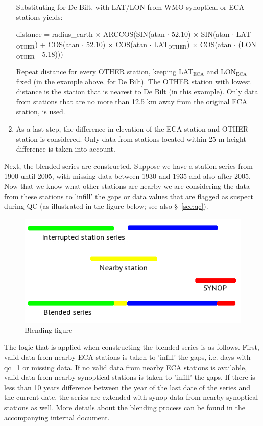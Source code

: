 \documentclass[a4paper,11pt]{article}
\begin{document}
\begin{enumerate}
Substituting for De Bilt, with LAT/LON from WMO synoptical or
ECA-stations yields:
\medskip

distance = radius\_earth $\times$
ARCCOS(SIN(atan $\cdot$ 52.10) $\times$
SIN(atan $\cdot$ LAT$_{\textrm{OTHER}}$) + COS(atan $\cdot$ 52.10) $\times$
COS(atan $\cdot$ LAT$_{\textrm{OTHER}}$) $\times$
COS(atan $\cdot$ (LON$_{\textrm{OTHER}}$ - 5.18)))
\medskip

Repeat distance for every OTHER station, keeping LAT$_{\textrm{ECA}}$
and LON$_{\textrm{ECA}}$ fixed (in the example above, for De
Bilt). The OTHER station with lowest distance is the station that is
nearest to De Bilt (in this example). Only data from stations that are
no more than 12.5 km away from the original ECA station, is used.

\item As a last step, the difference in elevation of the ECA station
  and OTHER station is considered. Only data from stations located
  within 25 m height difference is taken into account.
\end{enumerate}

Next, the blended series are constructed. Suppose we have a station
series from 1900 until 2005, with missing data between 1930 and 1935
and also after 2005. Now that we know what other stations are nearby
we are considering the data from these stations to 'infill' the gaps
or data values that are flagged as suspect during QC (as illustrated
in the figure below; see also \S~\ref{sec:qc}).

\begin{figure}[!ht]
\includegraphics[width=\textwidth]{blended_fig_new1.jpg}
\caption{Blending figure}
\label{fig:blend}
\end{figure}

The logic that is applied when constructing the blended series is as
follows. First, valid data from nearby ECA stations is taken to
'infill' the gaps, i.e. days with qc=1 or missing data. If no valid
data from nearby ECA stations is available, valid data from nearby
synoptical stations is taken to 'infill' the gaps. If there is less
than 10 years difference between the year of the last date of the
series and the current date, the series are extended with synop data
from nearby synoptical stations as well. More details about the
blending process can be found in the accompanying internal document.
\end{document}
